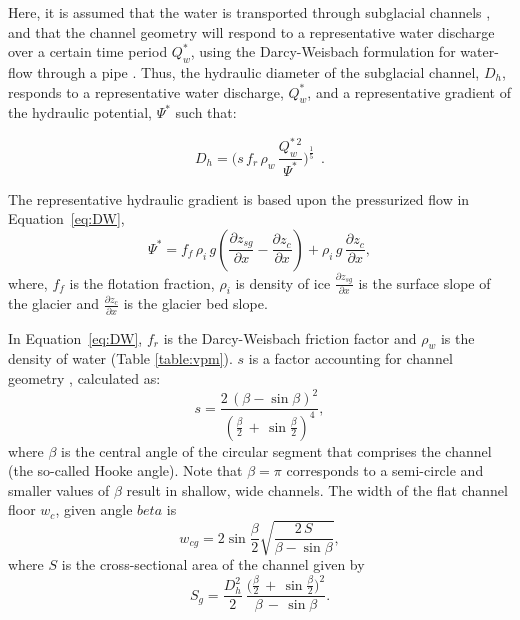 \documentclass[11pt]{article}
\begin{document}
\begin{spacing}{1}
  Here, it is assumed that the water is transported through subglacial channels \citep[Figure~\ref{fig:cartoon}; ][]{rothlisberger1972}, and that the channel  geometry will respond to a representative water discharge over a certain time period $Q_{w}^*$, using the Darcy-Weisbach formulation for water-flow through a pipe  \citep[e.g.][]{rothlisberger1972,clarke2003,werder2013}.
  Thus, the hydraulic diameter of the subglacial channel, $D_h$, responds to a representative water discharge, $Q_{w}^*$, and a representative gradient of the hydraulic potential, $\Psi^*$ such that:
  \begin{linenomath*}
    \begin{equation}
      \label{eq:DW}
      D_h = \big(s\, f_r\,\rho_w\, \frac{Q_w^{*\,2}}{\Psi^*}\big)^{\frac{1}{5}}~~.
    \end{equation}
  \end{linenomath*}
  The representative hydraulic gradient is based upon the pressurized flow in Equation~\ref{eq:DW},
  \begin{equation}
    \label{eq:psi}
    \Psi^*= f_f \,  \rho_i \, g (\frac{\partial  z_{sg}}{\partial x} - \frac{\partial z_c}{\partial x}) +  \rho_i \, g \, \frac{\partial z_c}{\partial x},
  \end{equation}
  \noindent
  where, $f_f$ is the flotation fraction, $\rho_i$ is density of ice $\frac{\partial z_{sg}}{\partial x}$ is the surface slope of the glacier and $\frac{\partial z_c}{\partial x}$ is the glacier bed slope.
  
  In Equation~\ref{eq:DW}, $f_r$ is the Darcy-Weisbach friction factor and $\rho_w$ is the density of water (Table \ref{table:vpm}). $s$ is a factor accounting for channel geometry \citep{hooke1990}, calculated as:
  \begin{equation}
    \label{eq:Hf}
    s = \frac{2\,(\beta -\sin \beta)^2}{(\frac{\beta}{2}\,+\,\sin \frac{\beta}{2})^4},
  \end{equation}
  where $\beta$ is the central angle of the circular segment that comprises the channel (the so-called Hooke angle). Note that $\beta =\pi$ corresponds to a semi-circle and
  smaller values of $\beta$ result in shallow, wide channels. 
  The width of the flat channel floor $w_c$, given angle $beta$ is 
  \begin{equation}
    \label{eq:dh2wc}
    w_{cg} = 2  \sin \frac{\beta}{2} \sqrt{\frac{2\, S}{\beta -\sin \beta}},
  \end{equation}
  where $S$ is the cross-sectional area of the channel given by
  \begin{equation}
    \label{eq:dh2S}
    S_g =  \frac{D_h^2}{2}~ \frac{\Big(\frac{\beta}{2} \,+ \, \sin \frac{\beta}{2}\Big)^2  }{\beta\,-\,\sin \beta}.
  \end{equation}
  

\end{spacing}
\end{document}
